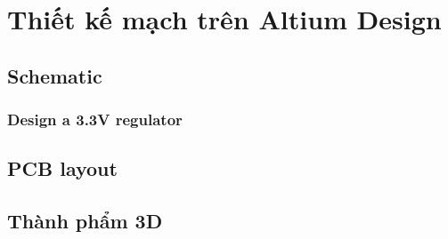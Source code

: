 \section{Thiết kế mạch trên Altium Design}
\subsection{Schematic}
\subsubsection{Design a 3.3V regulator}

\subsection{PCB layout}
\subsection{Thành phẩm 3D}
